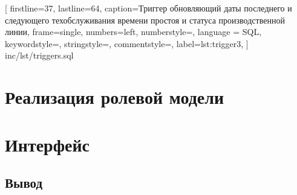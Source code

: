 
[
    firstline=37,
    lastline=64,
    caption=Триггер\text{,} обновляющий даты последнего и следующего техобслуживания\text{,} времени простоя и статуса производственной линии,
    frame=single,
    numbers=left,
	numberstyle=\footnotesize\color{numbers},
    language = SQL,
    keywordstyle=\color{keywords},
	stringstyle=\color{strings},
	commentstyle=\color{comments},
    label={lst:trigger3},
]
{inc/lst/triggers.sql}

\section{Реализация ролевой модели}

\section{Интерфейс}

\subsection*{Вывод}